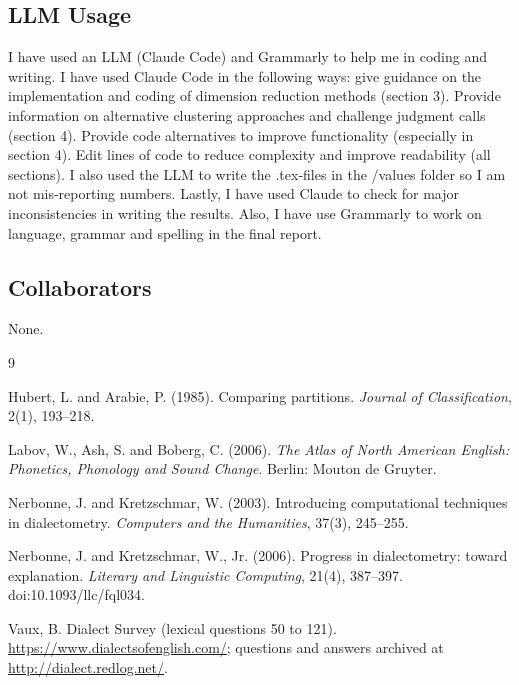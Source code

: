 \documentclass[10pt,letterpaper]{article}
\begin{document}
\subsection{LLM Usage}
I have used an LLM (Claude Code) and Grammarly to help me in coding and writing. I have used Claude Code in the following ways: give guidance on the implementation and coding of dimension reduction methods (section 3). Provide information on alternative clustering approaches and challenge judgment calls (section 4). Provide code alternatives to improve functionality (especially in section 4). Edit lines of code to reduce complexity and improve readability (all sections). I also used the LLM to write the .tex-files in the /values folder so I am not mis-reporting numbers. Lastly, I have used Claude to check for major inconsistencies in writing the results. Also, I have use Grammarly to work on language, grammar and spelling in the final report.

\subsection{Collaborators}
None.

\renewcommand{\refname}{Bibliography}
\begin{thebibliography}{9}
\setlength{\itemsep}{0pt}

Hubert, L. and Arabie, P. (1985). Comparing partitions. \emph{Journal of Classification}, 2(1), 193--218.

Labov, W., Ash, S. and Boberg, C. (2006). \emph{The Atlas of North American English: Phonetics, Phonology and Sound Change}. Berlin: Mouton de Gruyter.

Nerbonne, J. and Kretzschmar, W. (2003). Introducing computational techniques in dialectometry. \emph{Computers and the Humanities}, 37(3), 245--255.

Nerbonne, J. and Kretzschmar, W., Jr. (2006). Progress in dialectometry: toward explanation. \emph{Literary and Linguistic Computing}, 21(4), 387--397. doi:10.1093/llc/fql034.

Vaux, B. Dialect Survey (lexical questions 50 to 121). \url{https://www.dialectsofenglish.com/}; questions and answers archived at \url{http://dialect.redlog.net/}.

\end{thebibliography}
\end{document}
